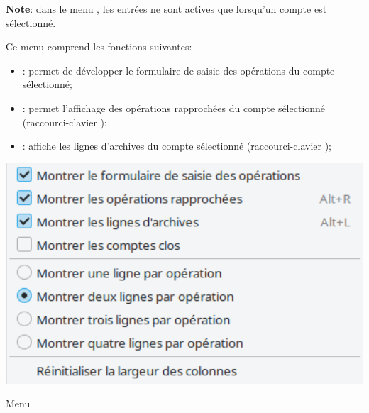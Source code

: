 \textbf{Note}: dans le menu , les entrées ne sont actives que lorsqu'un compte est sélectionné.

Ce menu comprend les fonctions suivantes:

\vspace{3mm}
\noindent
\begin{minipage}{.7\linewidth}
	\begin{itemize}[rightmargin=.6cm]
		\item {}: permet de développer le formulaire de saisie des opérations du compte sélectionné;
		\item {}: permet l'affichage des opérations rapprochées du compte sélectionné (raccourci-clavier );
		\item {}: affiche les lignes d'archives du compte sélectionné (raccourci-clavier );
	\end{itemize}
\end{minipage}
\hspace{10pt}	
\begin{minipage}{.3\linewidth}
	\centering						%
	\includegraphics[width=1\textwidth]{image/screenshot/home_menubar_view}
	\vspace{-20pt}					%
	\captionsetup{
		type=figure,%
		name=Fig.,%
		labelsep=newline}			%
	\caption{Menu }	%
	\label{home_menubar_view}
\end{minipage} 
